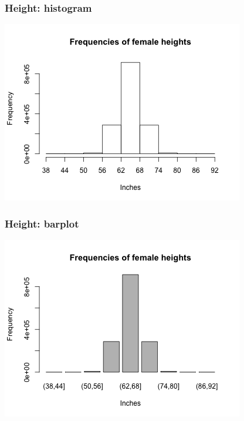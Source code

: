\documentclass[slidestop,compress,mathserif,12pt,t,professionalfonts,xcolor=table]{beamer}
\begin{document}
\begin{frame}
  \frametitle{Height: histogram}

  \begin{center}
    \includegraphics[scale=0.7]{figures/frequency-histogram-6.png}
    \end{center}

\end{frame}

\begin{frame}
  \frametitle{Height: barplot}

  \begin{center}
    \includegraphics[scale=0.7]{figures/frequency-barplot-6.png}
    \end{center}

\end{frame}
\end{document}
